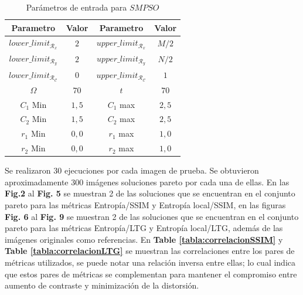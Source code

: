 \documentclass[spanish,twocolumn]{article}
\begin{document}
{\begin{table}[h]
\begin{center}
 \begin{tabular}{||c c | c c||} 
 \hline
 Parametro & Valor & Parametro & Valor \\ [0.5ex] 
 \hline\hline
 $lower\_limit_{\mathscr{R}_x}$ & $2$ & $upper\_limit_{\mathscr{R}_x}$ & $M/2$ \\ 
 \hline
 $lower\_limit_{\mathscr{R}_y}$ & $2$ & $upper\_limit_{\mathscr{R}_y}$ & $N/2$ \\  
 \hline
 $lower\_limit_{\mathscr{R}_{\mathscr{C}}}$ & $0$ & $upper\_limit_{\mathscr{R}_{\mathscr{C}}}$ & $1$ \\
\hline
$\Omega$ & $70$ & $t$ & $70$ \\ 
\hline
$C_1$ Min & $1,5$ & $C_1$ max & $2,5$ \\ 
\hline
$C_2$ Min & $1,5$ & $C_2$ max & $2,5$ \\ 
\hline
$r_1$ Min & $0,0$ & $r_1$ max & $1,0$ \\ 
\hline
$r_2$ Min & $0,0$ & $r_2$ max & $1,0$ \\ [1ex]
\hline
\end{tabular}
\end{center}
\caption[Parámetros de entrada para $SMPSO$]{Parámetros de entrada para $SMPSO$}
\label{table:parametrospso}
\end{table}
 
Se realizaron 30 ejecuciones por cada imagen de prueba. Se obtuvieron aproximadamente 300 imágenes soluciones pareto por cada una de ellas. En las \textbf{Fig.2} al \textbf {Fig. 5}  se muestran 2 de las soluciones que se encuentran en el conjunto pareto para las métricas Entropía/SSIM y Entropía local/SSIM, en las figuras \textbf {Fig. 6}  al \textbf {Fig. 9} se muestran 2 de las soluciones que se encuentran en el conjunto pareto para las métricas Entropía/LTG y Entropía local/LTG, además de las imágenes originales como referencias. En \textbf{Table \ref{tabla:correlacionSSIM}} y \textbf{Table \ref{tabla:correlacionLTG}} se muestran las correlaciones entre los pares de métricas utilizados, se puede notar una relación inversa entre ellas; lo cual indica que estos pares de métricas se complementan para mantener el compromiso entre aumento de contraste y minimización de la distorsión. 

}
\end{document}
